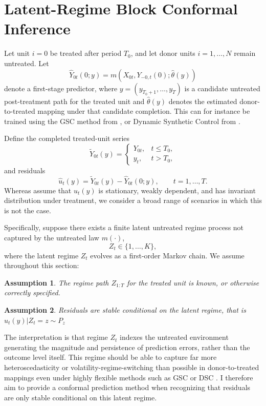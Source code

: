 \documentclass{article}
\newtheorem{assumption}{Assumption}
\begin{document}
\section{Latent-Regime Block Conformal Inference}

Let unit $i=0$ be treated after period $T_0$, and let donor units $i=1,\dots,N$ remain untreated. Let
\[
\hat Y_{0t}(0;y)=m(X_{0t},Y_{-0,t}(0);\hat\theta(y))
\]
denote a first-stage predictor, where $y=(y_{T_0+1},\dots,y_T)$ is a candidate untreated post-treatment path for the treated unit and $\hat\theta(y)$ denotes the estimated donor-to-treated mapping under that candidate completion. This can for instance be trained using the GSC method from \citet{Xu2017}, or Dynamic Synthetic Control from \citet{Cao2025}.

Define the completed treated-unit series
\[
\tilde Y_{0t}(y)=
\begin{cases}
Y_{0t}, & t\le T_0,\\
y_t, & t>T_0,
\end{cases}
\]
and residuals
\[
\hat u_t(y)=\tilde Y_{0t}(y)-\hat Y_{0t}(0;y), \qquad t=1,\dots,T.
\]
Whereas \citet{Chernozhukov2021} assume that $u_t(y)$ is stationary, weakly dependent, and has invariant distribution under treatment, we consider a broad range of scenarios in which this is not the case.

Specifically, suppose there exists a finite latent untreated regime process not captured by the untreated law $m(\cdot)$,
\[
Z_t \in \{1,\dots,K\},
\]
where the latent regime $Z_t$ evolves as a first-order Markov chain. We assume throughout this section:
\begin{assumption}
    The regime path $Z_{1:T}$ for the treated unit is known, or otherwise correctly specified.
    \label{trueregime}
\end{assumption}
\begin{assumption}
    Residuals are stable conditional on the latent regime, that is $\hat u_t(y) | Z_t = z \sim P_z$
    \label{stability}
\end{assumption}
The interpretation is that regime $Z_t$ indexes the untreated environment generating the magnitude and persistence of prediction errors, rather than the outcome level itself. This regime should be able to capture far more heteroscedasticity or volatility-regime-switching than possible in donor-to-treated mappings even under highly flexible methods such as GSC \citep{Xu2017} or DSC \citep{Cao2025}. I therefore aim to provide a conformal prediction method when recognizing that residuals are only stable conditional on this latent regime.
\end{document}
